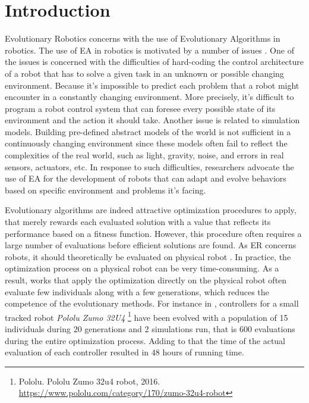 \chapter{Introduction}

Evolutionary Robotics concerns with the use of Evolutionary Algorithms in robotics. The use of EA in robotics is motivated by a number of issues \citep{meyer1998evolutionary,grefenstette1994evolutionary}. One of the issues is concerned with the difficulties of hard-coding the control architecture of a robot that has to solve a given task in an unknown or possible changing environment. Because it's impossible to predict each problem that a robot might encounter in a constantly changing environment. More precisely, it's difficult to program a robot control system that can foresee every possible state of its environment and the action it should take.  Another issue is related to simulation models. Building pre-defined abstract models of the world is not sufficient in a continuously changing environment since these models often fail to reflect the complexities of the real world, such as light, gravity, noise, and errors in real sensors, actuators, etc. In response to such difficulties, researchers advocate the use of EA for the development of robots that can adapt and evolve behaviors based on specific environment and problems it's facing.

Evolutionary algorithms are indeed attractive optimization procedures to apply, that merely rewards each evaluated solution with a value that reflects its performance based on a fitness function. However, this procedure often requires a large number of evaluations before efficient solutions are found. As ER concerns robots, it should theoretically be evaluated on physical robot \citep{floreano1998evolutionary}. In practice, the optimization process on a physical robot can be very time-consuming. As a result, works that apply the optimization directly on the physical robot often evaluate few individuals along with a few generations, which reduces the competence of the evolutionary methods. For instance in \citep{faina2017automating}, controllers for a small tracked robot \textit{Pololu Zumo 32U4} \footnote{Pololu. Pololu Zumo 32u4 robot, 2016. \url{https://www.pololu.com/category/170/zumo-32u4-robot}} have been evolved with a population of 15 individuals during 20 generations and 2 simulations run, that is 600 evaluations during the entire optimization process. Adding to that the time of the actual evaluation of each controller resulted in 48 hours of running time.

